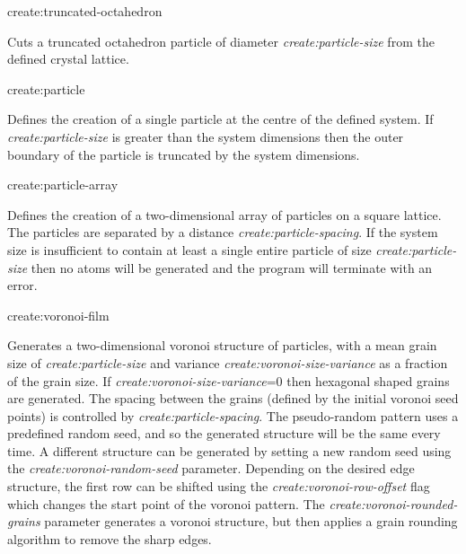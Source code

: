 {\zicf create:truncated-octahedron}
Cuts a truncated octahedron particle of diameter \textit{create:particle-size}
from the defined crystal lattice.


{\zicf create:particle} Defines the creation of a single particle at the centre of the defined system. If \textit{create:particle-size} is greater than the system dimensions then the outer boundary of the particle is truncated by the system dimensions.

{\zicf create:particle-array} Defines the creation of a two-dimensional array of particles on a square lattice. The particles are separated by a distance \textit{create:particle-spacing}. If the system size is insufficient to contain at least a single entire particle of size \textit{create:particle-size} then no atoms will be generated and the program will terminate with an error.


{\zicf create:voronoi-film} Generates a two-dimensional voronoi structure of particles, with a mean grain size of \textit{create:particle-size} and variance \textit{create:voronoi-size-variance} as a fraction of the grain size. If \textit{create:voronoi-size-variance}=0 then hexagonal shaped grains are generated. The spacing between the grains (defined by the initial voronoi seed points) is controlled by \textit{create:particle-spacing}. The pseudo-random pattern uses a predefined random seed, and so the generated structure will be the same every time. A different structure can be generated by setting a new random seed using the \textit{create:voronoi-random-seed} parameter. Depending on the desired edge structure, the first row can be shifted using the \textit{create:voronoi-row-offset} flag which changes the start point of the voronoi pattern. The \textit{create:voronoi-rounded-grains} parameter generates a voronoi structure, but then applies a grain rounding algorithm to remove the sharp edges.

